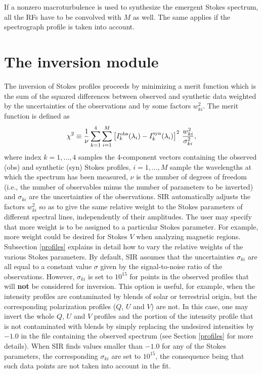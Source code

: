 \documentclass[11pt]{report}
\begin{document}
If a nonzero macroturbulence is used to synthesize the emergent Stokes
spectrum, all the RFs have to be convolved with $M$ as well. The same
applies if the spectrograph profile is taken into account.

\section{The inversion module}
\label{nodos}
The inversion of Stokes profiles proceeds by minimizing a merit function which 
is the sum of the squared differences between observed and synthetic data 
weighted by the uncertainties of the observations and by some factors 
$w_{ki}^2$. The merit function is defined as
\begin{equation}
\label{chi}
\chi^2 \equiv \frac{1}{\nu} \sum_{k=1}^4  \sum_{i=1}^M  
\left[ I_k^{\rm obs}(\lambda_i) - I_k^{\rm syn}(\lambda_i) \right]^2 \, 
\frac{w_{ki}^2}{\sigma_{ki}^2},
\end{equation}
where index $k=1,\ldots,4$ samples the 4-component vectors containing
the observed (obs) and synthetic (syn) Stokes profiles, $i =
1,\ldots,M$ sample the wavelengths at which the spectrum has been
measured, $\nu$ is the number of degrees of freedom (i.e., the number
of observables minus the number of parameters to be inverted) and
$\sigma_{ki}$ are the uncertainties of the observations. SIR
automatically adjusts the factors $w_{ki}^2$ so as to give the same
relative weight to the Stokes parameters of different spectral lines,
independently of their amplitudes. The user may specify that more weight is to be 
assigned to a particular Stokes parameter. For example, more weight
could be desired for Stokes $V$ when analyzing magnetic regions.
Subsection \ref{profiles} explains in detail how to vary the relative weights
of the various Stokes parameters. By default, SIR assumes that the
uncertainties $\sigma_{ki}$ are all equal to a constant value
$\sigma$ given by the signal-to-noise ratio of the observations.  
However, $\sigma_{ki}$ is set to $10^{15}$ for points in the 
observed profiles that will {\bf not} be considered for inversion. This
option is useful, for example, when the intensity profiles are
contaminated by blends of solar or terrestrial origin, but the
corresponding polarization profiles ($Q$, $U$ and $V$) are not. In this
case, one may invert the whole $Q$, $U$ and $V$ profiles and the portion
of the intensity profile that is not contaminated with blends by simply 
replacing the undesired intensities by $-1.0$ in the file containing the 
observed spectrum (see Section \ref{profiles} for more details). When SIR finds 
values smaller than $-1.0$ for any of the Stokes parameters, the 
corresponding $\sigma_{ki}$ are set to $10^{15}$, the consequence 
being that such data points are not taken into account in the fit.  
\end{document}
